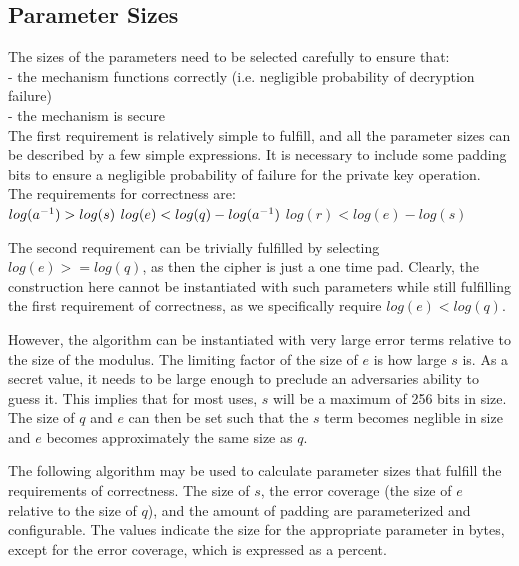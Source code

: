 \documentclass[preprint]{iacrtrans}
\begin{document}
\subsection{Parameter Sizes}
The sizes of the parameters need to be selected carefully to ensure that:\\
- the mechanism functions correctly (i.e. negligible probability of decryption failure)\\
- the mechanism is secure\\

The first requirement is relatively simple to fulfill, and all the parameter sizes can be described by a few simple expressions. It is necessary to include some padding bits to ensure a negligible probability of failure for the private key operation.\\

The requirements for correctness are:\\
$log(a^{-1}) > log(s)\\$
$log(e) <  log(q) - log(a^{-1})\\$
$log(r) < log(e) - log(s)$

The second requirement can be trivially fulfilled by selecting $log(e) >= log(q)$, as then the cipher is just a one time pad. Clearly, the construction here cannot be instantiated with such parameters while still fulfilling the first requirement of correctness, as we specifically require $log(e) < log(q)$. 

However, the algorithm can be instantiated with very large error terms relative to the size of the modulus. The limiting factor of the size of $e$ is how large $s$ is. As a secret value, it needs to be large enough to preclude an adversaries ability to guess it. This implies that for most uses, $s$ will be a maximum of 256 bits in size. The size of $q$ and $e$ can then be set such that the $s$ term becomes neglible in size and $e$ becomes approximately the same size as $q$.

The following algorithm may be used to calculate parameter sizes that fulfill the requirements of correctness. The size of $s$, the error coverage (the size of $e$ relative to the size of $q$), and the amount of padding are parameterized and configurable. The values indicate the size for the appropriate parameter in  bytes, except for the error coverage, which is expressed as a percent.
\end{document}
